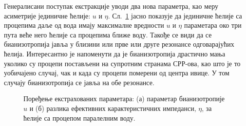 \documentclass[main.tex]{subfiles}
\begin{document}
Генералисани поступак екстракције уводи два нова параметра, као меру асиметрије јединичне ћелије: $u$ и $\eta$. Сл.~\ref{fig12} јасно показује да јединичне ћелије са процепима даље од вода имају максималне вредности $u$ и $\eta$ параметара око три пута веће него ћелије са процепима ближе воду. Такође се види да се бианизотропија јавља у близини или прве или друге резонансе одговарајућих ћелија. Интересантно је напоменути да је бианизотропија драстично мања уколико су процепи постављени на супротним странама СРР-ова, као што је то уобичајено случај, чак и када су процепи померени од центра ивице. У том случају бианизотропија се јавља на обе резонансе.
\begin{figure}[!t]
\centering
{}\hfill
{}
\caption{Поређење екстрахованих параметара: (а) параметар бианизотропије $u$ и (б) разлика ефективних карактеристичних импеданси, $\eta$, за ћелије са процепом паралелним воду.}
\label{fig12}
\end{figure} 
\end{document}
